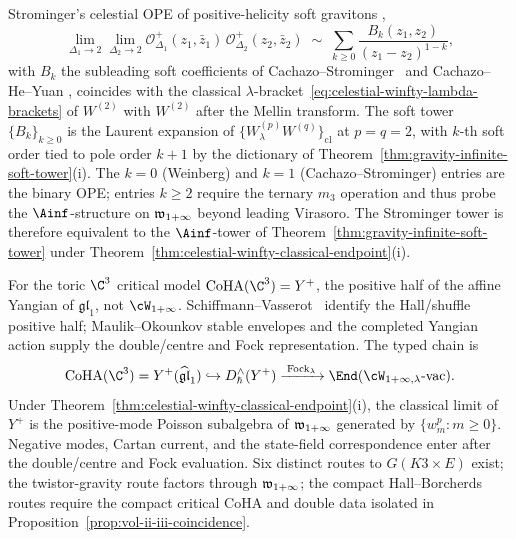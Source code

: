 \begin{remark}
\label{rem:soft-theorem-chiral-ope}
Strominger's celestial OPE of positive-helicity soft gravitons
\cite[eq.~(11)]{StromingerWInfinityCelestial},
\begin{equation}\label{eq:soft-graviton-ope}
\lim_{\Delta_1 \to 2}\lim_{\Delta_2 \to 2}
\mathcal{O}^+_{\Delta_1}(z_1, \bar z_1)\,\mathcal{O}^+_{\Delta_2}(z_2, \bar z_2)
\;\sim\;
\sum_{k \ge 0} \frac{B_k(z_1, z_2)}{(z_1 - z_2)^{1-k}},
\end{equation}
with $B_k$ the subleading soft coefficients of
Cachazo--Strominger~\cite{CachazoStrominger14} and
Cachazo--He--Yuan \cite[and the celestial sub-subleading literature via]{CachazoStrominger14}, coincides with the classical
$\lambda$-bracket~\eqref{eq:celestial-winfty-lambda-brackets} of
$W^{(2)}$ with $W^{(2)}$ after the Mellin transform. The soft tower
$\{B_k\}_{k \ge 0}$ is the Laurent expansion of
$\{W^{(p)}_\lambda W^{(q)}\}_{\mathrm{cl}}$ at $p = q = 2$, with
$k$-th soft order tied to pole order $k+1$ by the dictionary of
Theorem~\ref{thm:gravity-infinite-soft-tower}(i). The
$k = 0$ (Weinberg) and $k = 1$ (Cachazo--Strominger) entries are the
binary OPE; entries $k \ge 2$ require the ternary $m_3$ operation and
thus probe the $\Ainf$-structure on $\mathfrak{w}_{1+\infty}$ beyond leading Virasoro. The
Strominger tower is therefore equivalent to the $\Ainf$-tower of
Theorem~\ref{thm:gravity-infinite-soft-tower} under
Theorem~\ref{thm:celestial-winfty-classical-endpoint}(i).
\end{remark}

\begin{remark}[$\mathrm{CoHA}(\C^3)=Y^+$, not $\cW_{1+\infty}$]
\label{rem:cross-vol-coha-winfty}
For the toric $\C^3$ critical model
$\mathrm{CoHA}(\C^3) = Y^+$, the positive half of the affine
Yangian of $\mathfrak{gl}_1$, not $\cW_{1+\infty}$.
Schiffmann--Vasserot~\cite{SchiffmannVasserot13} identify the
Hall/shuffle positive half; Maulik--Okounkov stable envelopes and
the completed Yangian action supply the double/centre and Fock
representation. The typed chain is
\[
 \mathrm{CoHA}(\C^3)=Y^+(\widehat{\mathfrak{gl}}_1)
 \hookrightarrow D_\hbar^\wedge(Y^+)
 \xrightarrow{\;\mathrm{Fock}_\lambda\;}
 \End(\cW_{1+\infty,\lambda}\text{-}\mathrm{vac}).
\]
Under Theorem~\ref{thm:celestial-winfty-classical-endpoint}(i),
the classical limit of $Y^+$ is the positive-mode Poisson
subalgebra of $\mathfrak{w}_{1+\infty}$ generated by $\{w^p_m:m\ge0\}$. Negative
modes, Cartan current, and the state-field correspondence enter
after the double/centre and Fock evaluation. Six distinct routes
to $G(K3 \times E)$ exist; the twistor-gravity route factors
through $\mathfrak{w}_{1+\infty}$; the compact Hall--Borcherds routes require the
compact critical CoHA and double data isolated in
Proposition~\ref{prop:vol-ii-iii-coincidence}.
\end{remark}

